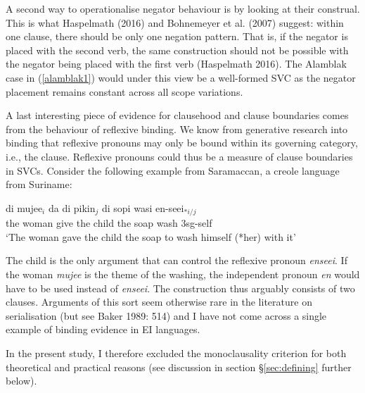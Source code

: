 A second way to operationalise negator behaviour is by looking at their construal. This is what Haspelmath (2016) and Bohnemeyer et al. (2007) suggest: within one clause, there should be only one negation pattern. That is, if the negator is placed with the second verb, the same construction should not be possible with the negator being placed with the first verb (Haspelmath 2016). The Alamblak case in (\ref{alamblak1}) would under this view be a  well-formed SVC as the negator placement remains constant across all scope variations.

A last interesting piece of evidence for clausehood and clause boundaries comes from the behaviour of reflexive binding. We know from generative research into binding that reflexive pronouns may only be bound within its governing category, i.e., the clause. Reflexive pronouns could thus be a measure of clause boundaries in SVCs. Consider the following example from Saramaccan, a creole language from Suriname:

\ea \label{}
\gll di mujee$_i$ da di pikin$_j$ di sopi wasi en-seei$_{*i/j}$ \\
the woman give the child the soap wash \acs{3}\acs{sg}-self \\
\glft `The woman gave the child the soap to wash himself (*her) with it' \\ 
\z
\xe

The child is the only argument that can control the reflexive pronoun \textit{enseei}. If the woman \textit{mujee} is the theme of the washing, the independent pronoun \textit{en} would have to be used instead of \textit{enseei}. The construction thus arguably consists of two clauses. Arguments of this sort seem otherwise rare in the literature on serialisation (but see Baker 1989: 514) and I have not come across a single example of binding evidence in EI languages.

In the present study, I therefore excluded the monoclausality criterion for both theoretical and practical reasons (see discussion in section §\ref{sec:defining} further below).

